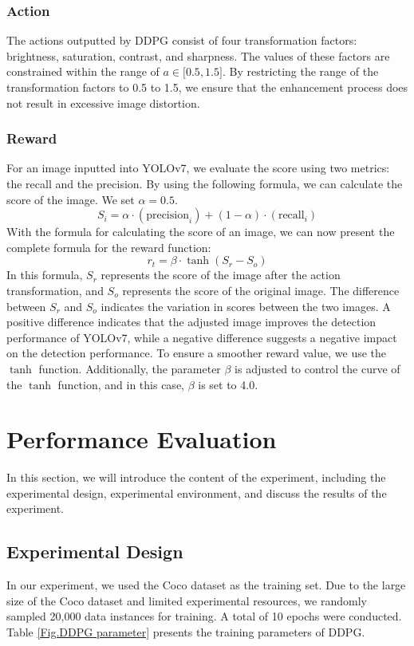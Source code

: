 \documentclass[PhD]{PHlab-thesis}
\begin{document}
\subsection{Action}
The actions outputted by DDPG consist of four transformation factors: brightness, saturation, contrast, and sharpness. The values of these factors are constrained within the range of $a\in\lbrack0.5,1.5\rbrack$. By restricting the range of the transformation factors to 0.5 to 1.5, we ensure that the enhancement process does not result in excessive image distortion.

\subsection{Reward}
For an image inputted into YOLOv7, we evaluate the score using two metrics: the recall and the precision. By using the following formula, we can calculate the score of the image. We set $\alpha=0.5$.
\begin{equation}
S_i=\alpha\cdot({\mathrm{precision}}_i)+(1-\alpha)\cdot({\mathrm{recall}}_i)
\end{equation}
With the formula for calculating the score of an image, we can now present the complete formula for the reward function:
\begin{equation}
\label{reward function}
r_t={\beta\cdot\tanh(S_r-S_o)}
\end{equation}
In this formula, $S_r$ represents the score of the image after the action transformation, and $S_o$ represents the score of the original image. The difference between $S_r$ and $S_o$ indicates the variation in scores between the two images. A positive difference indicates that the adjusted image improves the detection performance of YOLOv7, while a negative difference suggests a negative impact on the detection performance. To ensure a smoother reward value, we use the $\tanh$ function. Additionally, the parameter $\beta$ is adjusted to control the curve of the $\tanh$ function, and in this case, $\beta$ is set to 4.0.


\chapter{Performance Evaluation}
In this section, we will introduce the content of the experiment, including the experimental design, experimental environment, and discuss the results of the experiment.

\section{Experimental Design}
In our experiment, we used the Coco dataset \cite{lin2014microsoft} as the training set. Due to the large size of the Coco dataset and limited experimental resources, we randomly sampled 20,000 data instances for training. A total of 10 epochs were conducted. Table \ref{Fig.DDPG parameter} presents the training parameters of DDPG.
\end{document}
